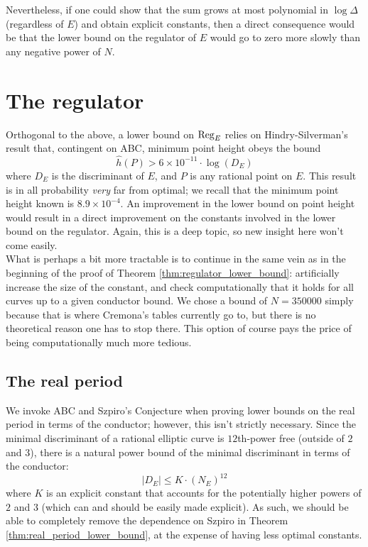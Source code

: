 Nevertheless, if one could show that the sum grows at most polynomial in $\log \Delta$ (regardless of $E$) and obtain explicit constants, then a direct consequence would be that the lower bound on the regulator of $E$ would go to zero more slowly than any negative power of $N$. \\

\section{The regulator}

Orthogonal to the above, a lower bound on $\operatorname{Reg}_E$ relies on Hindry-Silverman's \cite{HiS-1988} result that, contingent on ABC, minimum point height obeys the bound
\begin{equation}
\hat{h}(P) > 6\times 10^{-11}\cdot \log(D_E)
\end{equation}
where $D_E$ is the discriminant of $E$, and $P$ is any rational point on $E$. This result is in all probability {\it very} far from optimal; we recall that the minimum point height known is $8.9\times 10^{-4}$. An improvement in the lower bound on point height would result in a direct improvement on the constants involved in the lower bound on the regulator. Again, this is a deep topic, so new insight here won't come easily. \\

What is perhaps a bit more tractable is to continue in the same vein as in the beginning of the proof of Theorem \ref{thm:regulator_lower_bound}: artificially increase the size of the constant, and check computationally that it holds for all curves up to a given conductor bound. We chose a bound of $N=350000$ simply because that is where Cremona's tables currently go to, but there is no theoretical reason one has to stop there. This option of course pays the price of being computationally much more tedious. \\

\subsection{The real period}

We invoke ABC and Szpiro's Conjecture when proving lower bounds on the real period in terms of the conductor; however, this isn't strictly necessary. Since the minimal discriminant of a rational elliptic curve is $12$th-power free (outside of $2$ and $3$), there is a natural power bound of the minimal discriminant in terms of the conductor:
\begin{equation}
|D_E| \le K\cdot \left(N_E\right)^{12}
\end{equation}
where $K$ is an explicit constant that accounts for the potentially higher powers of $2$ and $3$ (which can and should be easily made explicit). As such, we should be able to completely remove the dependence on Szpiro in Theorem \ref{thm:real_period_lower_bound}, at the expense of having less optimal constants. \\

